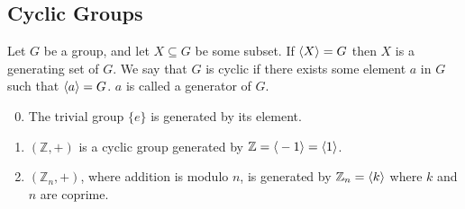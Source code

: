 \subsection{Cyclic Groups}
\begin{definition}
	Let \(G\) be a group, and let \(X \subseteq G\) be some subset.
	If \(\langle{} X \rangle = G\) then \(X\) is a generating set of \(G\).
	We say that \(G\) is cyclic if there exists some element \(a\) in \(G\) such that \(\langle{} a \rangle = G\).
	\(a\) is called a generator of \(G\).
\end{definition}
\begin{enumerate}
	\setcounter{enumi}{-1}
	\item The trivial group \(\{ e \}\) is generated by its element.
	\item \((\mathbb Z, +)\) is a cyclic group generated by \(\mathbb Z = \langle{} -1 \rangle = \langle{} 1 \rangle\).
	\item \((\mathbb Z_n, +)\), where addition is modulo \(n\), is generated by \(\mathbb Z_n = \langle{} k \rangle\) where \(k\) and \(n\) are coprime.
\end{enumerate}
